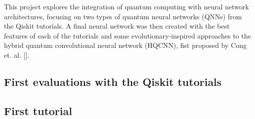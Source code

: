 \documentclass[conference]{IEEEtran}
\begin{document}
\noindent
This project explores the integration of quantum computing
with neural network architectures, focusing on two types of quantum neural
networks (QNNs) from the Qiskit tutorials. A final neural network was then
created with the best features of each of the tutorials and some evolutionary-inspired approaches to the hybrid quantum convolutional neural network (HQCNN), fist proposed by Cong et. al. [\cite{cong2019quantum}].\\



\subsection*{\fontsize{16}{20}\selectfont First evaluations with the Qiskit tutorials}

\subsection*{\fontsize{12}{16}\selectfont First tutorial}
\end{document}
